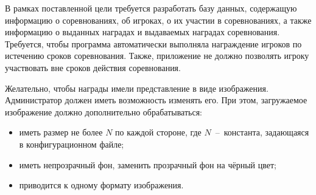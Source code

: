 



В рамках поставленной цели требуется разработать базу данных, содержащую информацию о соревнованиях, об игроках, о их участии в соревнованиях, а также информацию о выданных наградах и выдаваемых наградах соревнования. Требуется, чтобы программа автоматически выполняла награждение игроков по истечению сроков соревнования. Также, приложение не должно позволять игроку участвовать вне сроков действия соревнования. 

Желательно, чтобы награды имели представление в виде изображения. Администратор должен иметь возможность изменять его. При этом, загружаемое изображение должно дополнительно обрабатываться:
\begin{itemize}
	\item иметь размер не более $N$ по каждой стороне, где $N$~--~константа, задающаяся в конфигурационном файле;
	\item иметь непрозрачный фон, заменить прозрачный фон на чёрный цвет;
	\item приводится к одному формату изображения.
\end{itemize}



